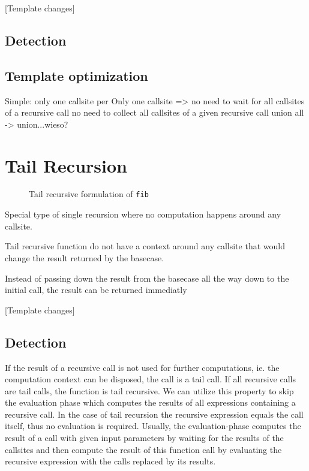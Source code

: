[Template changes]

\subsection{Detection}
\subsection{Template optimization}
Simple: only one callsite per 
Only one callsite => no need to wait for all callsites of a recursive call
no need to collect all callsites of a given recursive call
union all -> union...wieso?






\section{Tail Recursion}

\begin{wrapfigure}{r}{0.5\textwidth}
  \vspace{-20pt}
  \caption{Tail recursive formulation of \texttt{fib}}
  \label{lst:fib_tr}
\end{wrapfigure}

Special type of single recursion where no computation happens around any callsite.

Tail recursive function do not have a context around any callsite that would change the result returned by the basecase.

Instead of passing down the result from the basecase all the way down to the initial call, the result can be returned immediatly

[Template changes]

\subsection{Detection}
If the result of a recursive call is not used for further computations, ie. the computation context can be disposed, the call is a tail call. If all recursive calls are tail calls, the function is tail recursive. We can utilize this property to skip the evaluation phase which computes the results of all expressions containing a recursive call. In the case of tail recursion the recursive expression equals the call itself, thus no evaluation is required. Usually, the evaluation-phase computes the result of a call with given input parameters by waiting for the results of the callsites and then compute the result of this function call by evaluating the recursive expression with the calls replaced by its results.

